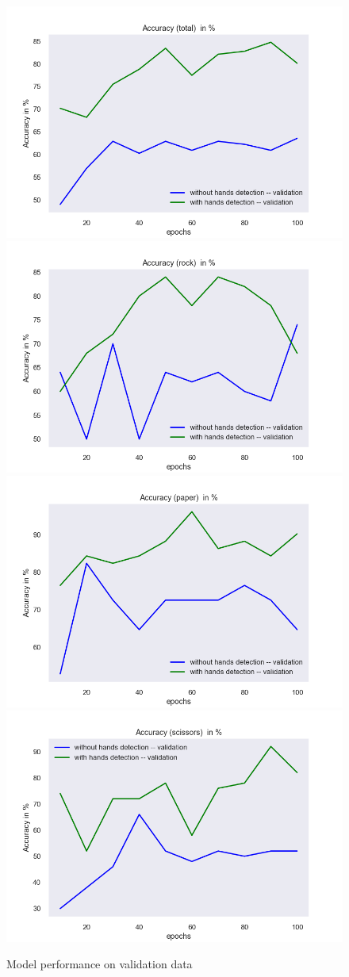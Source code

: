 \documentclass[a4paper]{article}
\begin{document}
\begin{figure}[H]
    \includegraphics[width=.49\textwidth]{img/experiment/model_comp_10steps__val_acc_total.png}\hfill
    \includegraphics[width=.49\textwidth]{img/experiment/model_comp_10steps__val_acc_rock.png}\hfill
    \\[\smallskipamount]
    \includegraphics[width=.49\textwidth]{img/experiment/model_comp_10steps__val_acc_paper.png}\hfill
    \includegraphics[width=.49\textwidth]{img/experiment/model_comp_10steps__val_acc_scissors.png}\hfill
    \caption{Model performance on validation data}
    \label{fig:exp-de-acc-val}
\end{figure}
\end{document}
